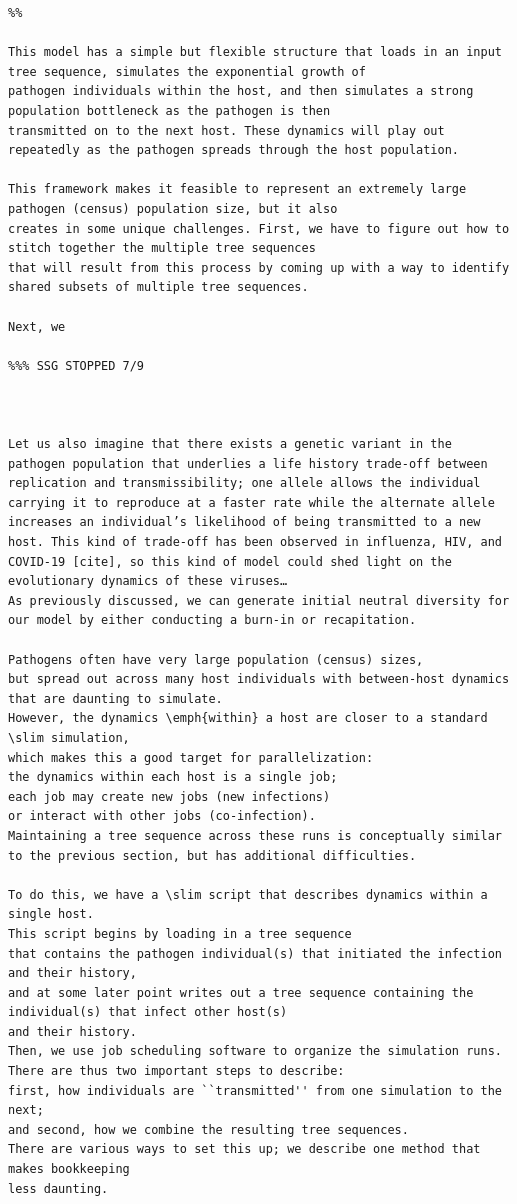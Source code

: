 \documentclass[12pt]{article}
\newcommand{\slim}[0]{\texttt{SLiM}\xspace}
\begin{document}
\begin{lstlisting}[language=slim]
%% insert code block
%%

This model has a simple but flexible structure that loads in an input tree sequence, simulates the exponential growth of
pathogen individuals within the host, and then simulates a strong population bottleneck as the pathogen is then
transmitted on to the next host. These dynamics will play out repeatedly as the pathogen spreads through the host population.

This framework makes it feasible to represent an extremely large pathogen (census) population size, but it also
creates in some unique challenges. First, we have to figure out how to stitch together the multiple tree sequences
that will result from this process by coming up with a way to identify shared subsets of multiple tree sequences.

Next, we 

%%% SSG STOPPED 7/9



Let us also imagine that there exists a genetic variant in the pathogen population that underlies a life history trade-off between replication and transmissibility; one allele allows the individual carrying it to reproduce at a faster rate while the alternate allele increases an individual’s likelihood of being transmitted to a new host. This kind of trade-off has been observed in influenza, HIV, and COVID-19 [cite], so this kind of model could shed light on the evolutionary dynamics of these viruses…
As previously discussed, we can generate initial neutral diversity for our model by either conducting a burn-in or recapitation. 

Pathogens often have very large population (census) sizes,
but spread out across many host individuals with between-host dynamics
that are daunting to simulate.
However, the dynamics \emph{within} a host are closer to a standard \slim simulation,
which makes this a good target for parallelization:
the dynamics within each host is a single job;
each job may create new jobs (new infections)
or interact with other jobs (co-infection).
Maintaining a tree sequence across these runs is conceptually similar
to the previous section, but has additional difficulties.

To do this, we have a \slim script that describes dynamics within a single host.
This script begins by loading in a tree sequence
that contains the pathogen individual(s) that initiated the infection and their history,
and at some later point writes out a tree sequence containing the individual(s) that infect other host(s)
and their history.
Then, we use job scheduling software to organize the simulation runs.
There are thus two important steps to describe:
first, how individuals are ``transmitted'' from one simulation to the next;
and second, how we combine the resulting tree sequences.
There are various ways to set this up; we describe one method that makes bookkeeping
less daunting.


\end{lstlisting}
\end{document}
